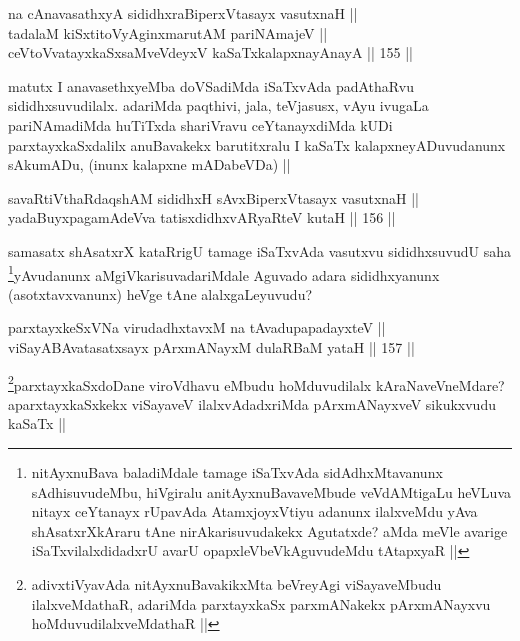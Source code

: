 \begin{shl}
na cAnavasathxyA sididhxraBiperxVtasayx vasutxnaH || \\
tadalaM kiSxtitoVyAginxmarutAM pariNAmajeV || \\
ceVtoVvatayxkaSxsaMveVdeyxV kaSaTxkalapxnayA\s nayA ||  155 ||  
\end{shl}	

\begin{artha}
matutx I anavasethxyeMba doVSadiMda iSaTxvAda padAthaRvu sididhxsuvudilalx. adariMda paqthivi, jala, teVjasusx, vAyu ivugaLa pariNAmadiMda huTiTxda shariVravu ceYtanayxdiMda kUDi parxtayxkaSxdalilx anuBavakekx barutitxralu I kaSaTx kalapxneyADuvudanunx sAkumADu, (inunx kalapxne mADabeVDa) ||
\end{artha}

\begin{shl}
savaRtiVthaRdaqshAM sididhxH sAvxBiperxVtasayx vasutxnaH || \\
yadaBuyxpagamAdeVva tatisxdidhxvARyaRteV kutaH ||  156 ||  
\end{shl}

\begin{artha}
samasatx shAsatxrX kataRrigU tamage iSaTxvAda vasutxvu sididhxsuvudU saha \footnote{nitAyxnuBava baladiMdale tamage iSaTxvAda sidAdhxMtavanunx sAdhisuvudeMbu, hiVgiralu anitAyxnuBavaveMbude veVdAMtigaLu heVLuva nitayx ceYtanayx rUpavAda AtamxjoyxVtiyu adanunx ilalxveMdu yAva shAsatxrXkAraru tAne nirAkarisuvudakekx Agutatxde? aMda meVle avarige iSaTxvilalxdidadxrU avarU opapxleVbeVkAguvudeMdu tAtapxyaR ||}yAvudanunx aMgiVkarisuvadariMdale Aguvado adara sididhxyanunx (asotxtavxvanunx) heVge tAne alalxgaLeyuvudu?
\end{artha}


\begin{shl}
parxtayxkeSxVNa virudadhxtavxM na tAvadupapadayxteV || \\
viSayABAvatasatxsayx pArxmANayxM dulaRBaM yataH ||  157 ||  
\end{shl}

\begin{artha}
\footnote{adivxtiVyavAda nitAyxnuBavakikxMta beVreyAgi viSayaveMbudu ilalxveMdathaR, adariMda parxtayxkaSx parxmANakekx pArxmANayxvu hoMduvudilalxveMdathaR ||}parxtayxkaSxdoDane viroVdhavu eMbudu hoMduvudilalx kAraNaveVneMdare? aparxtayxkaSxkekx viSayaveV ilalxvAdadxriMda pArxmANayxveV sikukxvudu kaSaTx ||
\end{artha}


